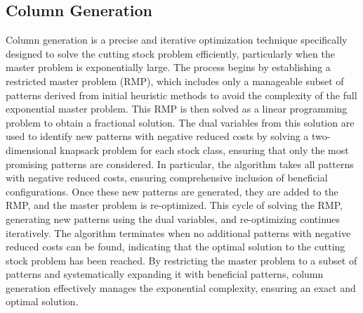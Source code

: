 \documentclass[a4paper]{article}
\begin{document}
\subsection{Column Generation}
Column generation is a precise and iterative optimization technique specifically designed to solve the cutting stock problem efficiently, particularly when the master problem is exponentially large. The process begins by establishing a restricted master problem (RMP), which includes only a manageable subset of patterns derived from initial heuristic methods to avoid the complexity of the full exponential master problem. This RMP is then solved as a linear programming problem to obtain a fractional solution. The dual variables from this solution are used to identify new patterns with negative reduced costs by solving a two-dimensional knapsack problem for each stock class, ensuring that only the most promising patterns are considered. In particular, the algorithm takes all patterns with negative reduced costs, ensuring comprehensive inclusion of beneficial configurations. Once these new patterns are generated, they are added to the RMP, and the master problem is re-optimized. This cycle of solving the RMP, generating new patterns using the dual variables, and re-optimizing continues iteratively. The algorithm terminates when no additional patterns with negative reduced costs can be found, indicating that the optimal solution to the cutting stock problem has been reached. By restricting the master problem to a subset of patterns and systematically expanding it with beneficial patterns, column generation effectively manages the exponential complexity, ensuring an exact and optimal solution.
\vspace{0.25cm}
\end{document}
